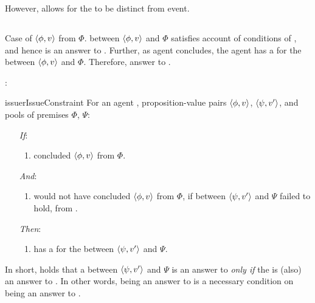 \begin{note}
  However, allows for the \wit{} to be distinct from event.%
\end{note}

\subsection{\issueConstraint{}}
\label{sec:variants-initial:issue}

\begin{note}
  Case of \(\langle \phi, v \rangle\) from \(\Phi\).
  \ros{} between \(\langle \phi, v \rangle\) and \(\Phi\) satisfies account of conditions of \qWhyVnP{}, and hence is an answer to \qWhyVnP{}.
  Further, as agent concludes, the agent has a  for the \ros{} between \(\langle \phi, v \rangle\) and \(\Phi\).
  Therefore, answer to \qHowV{}.
\end{note}

\begin{note}
  \issueConstraint{}:

  \begin{restatable}[\issueConstraint{}]{issue}{rIssueConstraint}
    \label{issue:has-witnessed}
    For an agent \vAgent{}, proposition-value pairs \(\langle \phi, v \rangle\), \(\langle \psi, v' \rangle\), and pools of premises \(\Phi\), \(\Psi\):

    \begin{enumerate}
    \item[\emph{If}:]
      \begin{enumerate}[label=\alph*., ref=(\alph*)]
      \item \vAgent{} concluded \(\langle \phi, v \rangle\) from \(\Phi\).
      \end{enumerate}
    \item[\emph{And}:]
      \begin{enumerate}[label=\alph*., ref=(\alph*), resume]
      \item
        \vAgent{} would not have concluded \(\langle \phi, v \rangle\) from \(\Phi\), if \support{} between \(\langle \psi, v' \rangle\) and \(\Psi\) failed to hold, from .
      \end{enumerate}
    \item[\emph{Then}:]
      \begin{enumerate}[label=\alph*., ref=(\alph*), resume]
      \item
        \vAgent{} has a  for the \ros{} between \(\langle \psi, v' \rangle\) and \(\Psi\).
      \end{enumerate}
    \end{enumerate}
    \vspace{-\baselineskip}
  \end{restatable}

  In short, \issueConstraint{} holds that a \ros{} between \(\langle \psi, v' \rangle\) and \(\Psi\) is an answer to \qWhyV{} \emph{only if} the \ros{} is (also) an answer to \qHowV{}.
  In other words, being an answer to \qHowV{} is a necessary condition on being an answer to \qWhyV{}.
\end{note}

